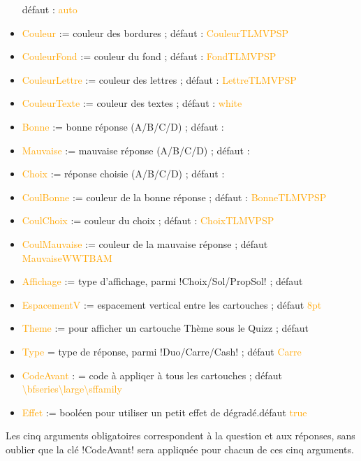 \documentclass[french,a4paper,11pt]{article}
\newcommand\Cle[1]{{\small\sffamily\textlangle \textcolor{orange}{#1}\textrangle}}
\begin{document}
\begin{tipblock}
\begin{itemize}
	\hfill{}défaut : \Cle{auto}
	\item \Cle{Couleur} := couleur des bordures ; \hfill{}défaut : \Cle{CouleurTLMVPSP}
	\item \Cle{CouleurFond} := couleur du fond ; \hfill{}défaut : \Cle{FondTLMVPSP}
	\item \Cle{CouleurLettre} := couleur des lettres ; \hfill{}défaut : \Cle{LettreTLMVPSP}
	\item \Cle{CouleurTexte} := couleur des textes ; \hfill{}défaut : \Cle{white}
	\item \Cle{Bonne} := bonne réponse (A/B/C/D) ; \hfill{}défaut : \Cle{}
	\item \Cle{Mauvaise} := mauvaise réponse (A/B/C/D) ; \hfill{}défaut : \Cle{}
	\item \Cle{Choix} := réponse choisie (A/B/C/D) ; \hfill{}défaut : \Cle{}
	\item \Cle{CoulBonne} := couleur de la bonne réponse ; \hfill{}défaut : \Cle{BonneTLMVPSP}
	\item \Cle{CoulChoix} := couleur du choix ; \hfill{}défaut : \Cle{ChoixTLMVPSP}
	\item \Cle{CoulMauvaise} := couleur de la mauvaise réponse ; \hfill{}défaut \Cle{MauvaiseWWTBAM}
	\item \Cle{Affichage} := type d'affichage, parmi \motcletex!Choix/Sol/PropSol! ; \hfill{}défaut \Cle{}
	\item \Cle{EspacementV} := espacement vertical entre les cartouches ; \hfill{}défaut \Cle{8pt}
	\item \Cle{Theme} := pour afficher un cartouche \textsf{Thème} sous le Quizz ; \hfill{}défaut \Cle{}
	\item \Cle{Type} = type de réponse, parmi \motcletex!Duo/Carre/Cash! ; \hfill{}défaut \Cle{Carre}
	\item \Cle{CodeAvant} : = code à appliqer à tous les cartouches ; \hfill{}défaut \Cle{\textbackslash bfseries\textbackslash large\textbackslash sffamily}
	\item \Cle{Effet} := booléen pour utiliser un petit effet de dégradé.\hfill{}défaut \Cle{true}
\end{itemize}
\vspace*{-\baselineskip}\leavevmode
\end{tipblock}

\begin{tipblock}
Les cinq arguments obligatoires correspondent à la question et aux réponses, sans oublier que la clé \motcletex!CodeAvant! sera appliquée pour chacun de ces cinq arguments.
\end{tipblock}
\end{document}
